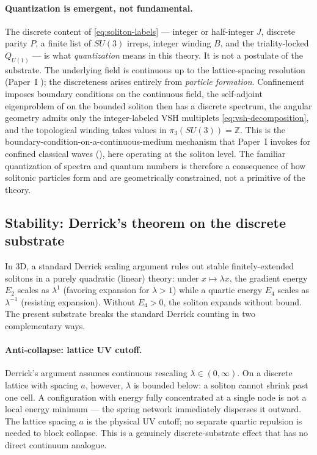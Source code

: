 \paragraph{Quantization is emergent, not fundamental.}
The discrete content of \eqref{eq:soliton-labels} --- integer or half-integer $J$, discrete parity
$P$, a finite list of $SU(3)$ irreps, integer winding $B$, and the triality-locked $Q_{U(1)}$ ---
is what \emph{quantization} means in this theory.
It is not a postulate of the substrate.
The underlying field is continuous up to the lattice-spacing resolution (Paper~I
); the discreteness arises entirely from \emph{particle formation}.
Confinement imposes boundary conditions on the continuous field, the self-adjoint eigenproblem of
 on the bounded soliton then has a discrete spectrum, the angular
geometry admits only the integer-labeled VSH multiplets \eqref{eq:vsh-decomposition}, and the
topological winding takes values in $\pi_3(SU(3))=\mathbb{Z}$.
This is the boundary-condition-on-a-continuous-medium mechanism that Paper~I invokes for confined
classical waves (), here operating at the soliton level.
The familiar quantization of spectra and quantum numbers is therefore a consequence of how
solitonic particles form and are geometrically constrained, not a primitive of the theory.

\subsection{Stability: Derrick's theorem on the discrete substrate}
\label{subsec:derrick}

In 3D, a standard Derrick scaling argument \citep{Derrick1964} rules out stable finitely-extended
solitons in a purely quadratic (linear) theory: under $x\mapsto\lambda x$, the gradient energy
$E_2$ scales as $\lambda^{1}$ (favoring expansion for $\lambda>1$) while a quartic energy $E_4$
scales as $\lambda^{-1}$ (resisting expansion).
Without $E_4>0$, the soliton expands without bound.
The present substrate breaks the standard Derrick counting in two complementary ways.

\paragraph{Anti-collapse: lattice UV cutoff.}
Derrick's argument assumes continuous rescaling $\lambda\in(0,\infty)$.
On a discrete lattice with spacing $a$, however, $\lambda$ is bounded below: a soliton cannot
shrink past one cell.
A configuration with energy fully concentrated at a single node is not a local energy minimum ---
the spring network immediately disperses it outward.
The lattice spacing $a$ is the physical UV cutoff; no separate quartic repulsion is needed to block
collapse.
This is a genuinely discrete-substrate effect that has no direct continuum analogue.

